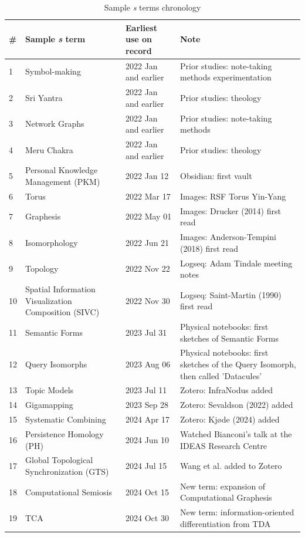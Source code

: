 \begin{table}[htbp]
  \centering
  \begin{tabular}{p{0.4cm}p{4cm}p{2.5cm}p{5cm}}
      \toprule
      \textbf{\#} & \textbf{Sample \textit{s} term} & \textbf{Earliest use on record} & \textbf{Note} \\
      \midrule
      1 & Symbol-making & 2022 Jan and earlier & Prior studies: note-taking methods experimentation \\
      2 & Sri Yantra & 2022 Jan and earlier & Prior studies: theology \\
      3 & Network Graphs & 2022 Jan and earlier & Prior studies: note-taking methods \\
      4 & Meru Chakra & 2022 Jan and earlier & Prior studies: theology \\
      5 & Personal Knowledge Management (PKM) & 2022 Jan 12 & Obsidian: first vault \\
      6 & Torus & 2022 Mar 17 & Images: RSF Torus Yin-Yang \\
      7 & Graphesis & 2022 May 01 & Images: Drucker (2014) first read \\
      8 & Isomorphology & 2022 Jun 21 & Images: Anderson-Tempini (2018) first read \\
      9 & Topology & 2022 Nov 22 & Logseq: Adam Tindale meeting notes \\
      10 & Spatial Information Visualization Composition (SIVC) & 2022 Nov 30 & Logseq: Saint-Martin (1990) first read \\
      11 & Semantic Forms & 2023 Jul 31 & Physical notebooks: first sketches of Semantic Forms \\
      12 & Query Isomorphs  & 2023 Aug 06 & Physical notebooks: first sketches of the Query Isomorph, then called 'Datacules' \\
      13 & Topic Models & 2023 Jul 11 & Zotero: InfraNodus added \\
      14 & Gigamapping & 2023 Sep 28 & Zotero: Sevaldson (2022) added  \\
      15 & Systematic Combining & 2024 Apr 17 & Zotero: Kjøde (2024) added \\
      16 & Persistence Homology (PH) & 2024 Jun 10 & Watched Bianconi's talk at the IDEAS Research Centre \\
      17 & Global Topological Synchronization (GTS) & 2024 Jul 15 & Wang et al. added to Zotero \\
      18 & Computational Semiosis & 2024 Oct 15 & New term: expansion of Computational Graphesis \\
      19 & TCA & 2024 Oct 30 & New term: information-oriented differentiation from TDA \\
      \bottomrule
  \end{tabular}
  \caption{Sample \textit{s} terms chronology}
  \label{tab:semantic_fields}
\end{table}


